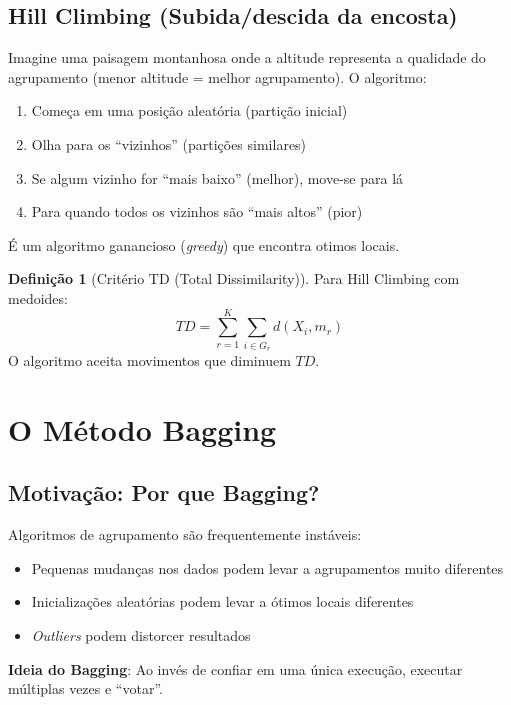 \documentclass[12pt,a4paper]{article}
\theoremstyle{definition}
\newtheorem{definicao}{Definição}[section]
\begin{document}
\subsection{Hill Climbing (Subida/descida da encosta)}

\begin{tcolorbox}[caixaalgoritmo={Analogia da Montanha}]
Imagine uma paisagem montanhosa onde a altitude representa a qualidade do agrupamento (menor altitude = melhor agrupamento). O algoritmo:
\begin{enumerate}
    \item Começa em uma posição aleatória (partição inicial)
    \item Olha para os ``vizinhos'' (partições similares)
    \item Se algum vizinho for ``mais baixo'' (melhor), move-se para lá
    \item Para quando todos os vizinhos são ``mais altos'' (pior)
\end{enumerate}
É um algoritmo ganancioso (\textit{greedy}) que encontra otimos locais.
\end{tcolorbox}

\begin{definicao}[Critério TD (Total Dissimilarity)]
Para Hill Climbing com medoides:
\begin{equation}
TD = \sum_{r=1}^K \sum_{i \in G_r} d(X_i, m_r)
\end{equation}
O algoritmo aceita movimentos que diminuem $TD$.
\end{definicao}

\section{O Método Bagging}

\subsection{Motivação: Por que Bagging?}

\begin{tcolorbox}[caixaimportante={O Problema da Instabilidade}]
Algoritmos de agrupamento são frequentemente instáveis:
\begin{itemize}
    \item Pequenas mudanças nos dados podem levar a agrupamentos muito diferentes
    \item Inicializações aleatórias podem levar a ótimos locais diferentes
    \item \textit{Outliers} podem distorcer resultados
\end{itemize}
\textbf{Ideia do Bagging}: Ao invés de confiar em uma única execução, executar múltiplas vezes e ``votar''.
\end{tcolorbox}
\end{document}
